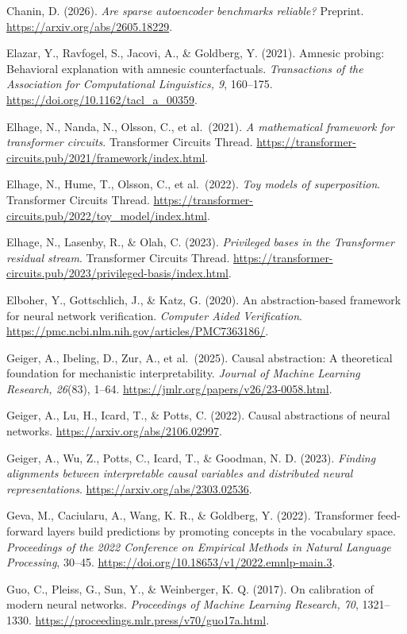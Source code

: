 \documentclass[
  british,
  11pt,
  a4paper,
]{article}
\begin{document}
Chanin, D. (2026). \emph{Are sparse autoencoder benchmarks reliable?}
Preprint. \url{https://arxiv.org/abs/2605.18229}.

Elazar, Y., Ravfogel, S., Jacovi, A., \& Goldberg, Y. (2021). Amnesic
probing: Behavioral explanation with amnesic counterfactuals.
\emph{Transactions of the Association for Computational Linguistics, 9},
160--175. \url{https://doi.org/10.1162/tacl_a_00359}.

Elhage, N., Nanda, N., Olsson, C., et al.~(2021). \emph{A mathematical
framework for transformer circuits}. Transformer Circuits Thread.
\url{https://transformer-circuits.pub/2021/framework/index.html}.

Elhage, N., Hume, T., Olsson, C., et al.~(2022). \emph{Toy models of
superposition}. Transformer Circuits Thread.
\url{https://transformer-circuits.pub/2022/toy_model/index.html}.

Elhage, N., Lasenby, R., \& Olah, C. (2023). \emph{Privileged bases in
the Transformer residual stream}. Transformer Circuits Thread.
\url{https://transformer-circuits.pub/2023/privileged-basis/index.html}.

Elboher, Y., Gottschlich, J., \& Katz, G. (2020). An abstraction-based
framework for neural network verification. \emph{Computer Aided
Verification}. \url{https://pmc.ncbi.nlm.nih.gov/articles/PMC7363186/}.

Geiger, A., Ibeling, D., Zur, A., et al.~(2025). Causal abstraction: A
theoretical foundation for mechanistic interpretability. \emph{Journal
of Machine Learning Research, 26}(83), 1--64.
\url{https://jmlr.org/papers/v26/23-0058.html}.

Geiger, A., Lu, H., Icard, T., \& Potts, C. (2022). Causal abstractions
of neural networks. \url{https://arxiv.org/abs/2106.02997}.

Geiger, A., Wu, Z., Potts, C., Icard, T., \& Goodman, N. D. (2023).
\emph{Finding alignments between interpretable causal variables and
distributed neural representations}.
\url{https://arxiv.org/abs/2303.02536}.

Geva, M., Caciularu, A., Wang, K. R., \& Goldberg, Y. (2022).
Transformer feed-forward layers build predictions by promoting concepts
in the vocabulary space. \emph{Proceedings of the 2022 Conference on
Empirical Methods in Natural Language Processing}, 30--45.
\url{https://doi.org/10.18653/v1/2022.emnlp-main.3}.

Guo, C., Pleiss, G., Sun, Y., \& Weinberger, K. Q. (2017). On
calibration of modern neural networks. \emph{Proceedings of Machine
Learning Research, 70}, 1321--1330.
\url{https://proceedings.mlr.press/v70/guo17a.html}.
\end{document}
